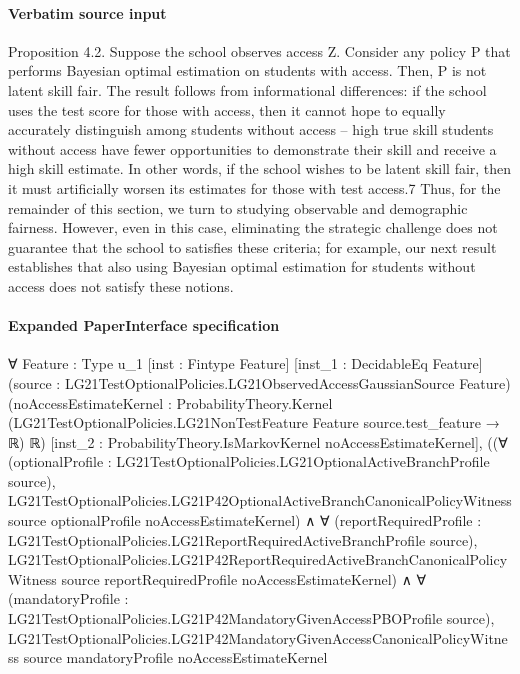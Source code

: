 \documentclass[10pt]{article}
\begin{document}
\paragraph{Verbatim source input}
\begin{ReviewVerbatim}
Proposition 4.2. Suppose the school observes access Z. Consider any policy P that performs
Bayesian optimal estimation on students with access. Then, P is not latent skill fair.
The result follows from informational diﬀerences: if the school uses the test score for those with
access, then it cannot hope to equally accurately distinguish among students without access – high
true skill students without access have fewer opportunities to demonstrate their skill and receive a
high skill estimate. In other words, if the school wishes to be latent skill fair, then it must artiﬁcially
worsen its estimates for those with test access.7
Thus, for the remainder of this section, we turn to studying observable and demographic fairness.
However, even in this case, eliminating the strategic challenge does not guarantee that the school
to satisﬁes these criteria; for example, our next result establishes that also using Bayesian optimal
estimation for students without access does not satisfy these notions.
\end{ReviewVerbatim}


\paragraph{Expanded PaperInterface specification}
\begin{ReviewVerbatim}
∀ {Feature : Type u_1} [inst : Fintype Feature] [inst_1 : DecidableEq Feature]
  (source : LG21TestOptionalPolicies.LG21ObservedAccessGaussianSource Feature)
  (noAccessEstimateKernel :
    ProbabilityTheory.Kernel (LG21TestOptionalPolicies.LG21NonTestFeature Feature source.test_feature → ℝ) ℝ)
  [inst_2 : ProbabilityTheory.IsMarkovKernel noAccessEstimateKernel],
  ((∀ (optionalProfile : LG21TestOptionalPolicies.LG21OptionalActiveBranchProfile source),
        LG21TestOptionalPolicies.LG21P42OptionalActiveBranchCanonicalPolicyWitness source optionalProfile
          noAccessEstimateKernel) ∧
      ∀ (reportRequiredProfile : LG21TestOptionalPolicies.LG21ReportRequiredActiveBranchProfile source),
        LG21TestOptionalPolicies.LG21P42ReportRequiredActiveBranchCanonicalPolicyWitness source reportRequiredProfile
          noAccessEstimateKernel) ∧
    ∀ (mandatoryProfile : LG21TestOptionalPolicies.LG21P42MandatoryGivenAccessPBOProfile source),
      LG21TestOptionalPolicies.LG21P42MandatoryGivenAccessCanonicalPolicyWitness source mandatoryProfile
        noAccessEstimateKernel
\end{ReviewVerbatim}
\end{document}
